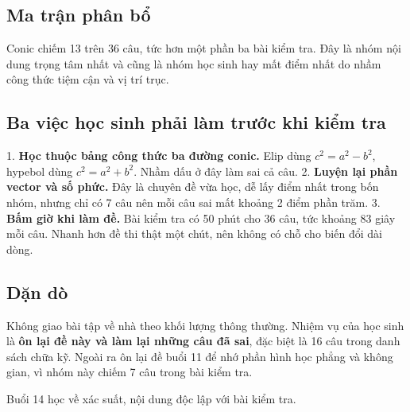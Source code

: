 \documentclass[11pt, a4paper]{article}
\begin{document}
\subsection{Ma trận phân bổ}


Conic chiếm 13 trên 36 câu, tức hơn một phần ba bài kiểm tra. Đây là nhóm nội dung trọng tâm nhất và cũng là nhóm học sinh hay mất điểm nhất do nhầm công thức tiệm cận và vị trí trục.

\subsection{Ba việc học sinh phải làm trước khi kiểm tra}

1. \textbf{Học thuộc bảng công thức ba đường conic.} Elip dùng $c^2=a^2-b^2$, hypebol dùng $c^2=a^2+b^2$. Nhầm dấu ở đây làm sai cả câu.
2. \textbf{Luyện lại phần vector và số phức.} Đây là chuyên đề vừa học, dễ lấy điểm nhất trong bốn nhóm, nhưng chỉ có 7 câu nên mỗi câu sai mất khoảng 2 điểm phần trăm.
3. \textbf{Bấm giờ khi làm đề.} Bài kiểm tra có 50 phút cho 36 câu, tức khoảng 83 giây mỗi câu. Nhanh hơn đề thi thật một chút, nên không có chỗ cho biến đổi dài dòng.

\subsection{Dặn dò}

Không giao bài tập về nhà theo khối lượng thông thường. Nhiệm vụ của học sinh là \textbf{ôn lại đề này và làm lại những câu đã sai}, đặc biệt là 16 câu trong danh sách chữa kỹ. Ngoài ra ôn lại đề buổi 11 để nhớ phần hình học phẳng và không gian, vì nhóm này chiếm 7 câu trong bài kiểm tra.

Buổi 14 học về xác suất, nội dung độc lập với bài kiểm tra.
\end{document}
